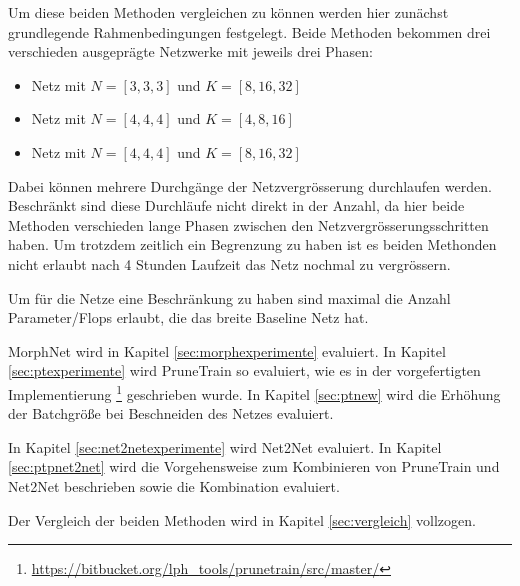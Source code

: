 Um diese beiden Methoden vergleichen zu können werden hier zunächst grundlegende Rahmenbedingungen festgelegt.
Beide Methoden bekommen drei verschieden ausgeprägte Netzwerke mit jeweils drei Phasen:
\begin{itemize}
 \item Netz mit $N=[3,3,3]$ und $K=[8,16,32] $
 \item Netz mit $N=[4,4,4]$ und $K=[4,8,16] $
 \item Netz mit $N=[4,4,4]$ und $K=[8,16,32] $
\end{itemize}
Dabei können mehrere Durchgänge der Netzvergrösserung durchlaufen werden. Beschränkt sind diese Durchläufe nicht direkt in der Anzahl, da hier beide Methoden verschieden lange Phasen zwischen den Netzvergrösserungsschritten haben. Um trotzdem zeitlich ein Begrenzung zu haben ist es beiden Methonden nicht erlaubt nach 4 Stunden Laufzeit das Netz nochmal zu vergrössern.

Um für die Netze eine Beschränkung zu haben sind maximal die Anzahl Parameter/Flops erlaubt, die das breite Baseline Netz hat.

MorphNet wird in Kapitel \ref{sec:morphexperimente} evaluiert. In Kapitel \ref{sec:ptexperimente} wird PruneTrain so evaluiert, wie es in der vorgefertigten Implementierung \footnote{\url{https://bitbucket.org/lph\_tools/prunetrain/src/master/}} geschrieben wurde. In Kapitel \ref{sec:ptnew} wird die Erhöhung der Batchgröße bei Beschneiden des Netzes evaluiert.

In Kapitel \ref{sec:net2netexperimente} wird Net2Net evaluiert.
In Kapitel \ref{sec:ptpnet2net} wird die Vorgehensweise zum Kombinieren von PruneTrain und Net2Net beschrieben sowie die Kombination evaluiert.

Der Vergleich der beiden Methoden wird in Kapitel \ref{sec:vergleich} vollzogen.






